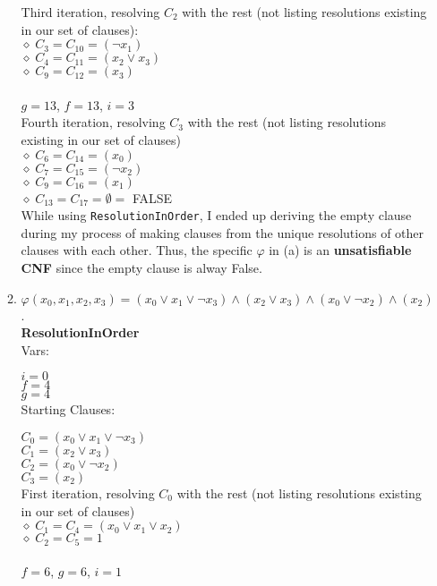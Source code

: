 \documentclass[11pt]{article}
\begin{document}
\begin{enumerate}
\begin{enumerate}
      Third iteration, resolving $C_2$ with the rest (not listing resolutions existing in our set of clauses): \\
      $\diamond \; C_3 = C_{10} = (\neg x_1)$ \\
      $\diamond \; C_4 = C_{11} = (x_2 \vee x_3) $ \\
      $\diamond \; C_9 = C_{12} = (x_3)$ \\
      \\
      $g = 13$, $f=13$, $i=3$ \\

      Fourth iteration, resolving $C_3$ with the rest (not listing resolutions existing in our set of clauses) \\
      $\diamond \; C_6 = C_{14} = (x_0)$ \\
      $\diamond \; C_7 = C_{15} = (\neg x_2)$ \\
      $\diamond \; C_9 = C_{16} = (x_1)$ \\
      $\diamond \; C_{13} = C_{17} = \emptyset =$ FALSE \\

      While using \texttt{ResolutionInOrder}, I ended up deriving the empty clause during my process of making clauses from the unique resolutions of other clauses with each other. Thus, the specific $\varphi$ in (a) is an \textbf{unsatisfiable CNF} since the empty clause is alway False.  \\
   

    \item $\varphi(x_0, x_1, x_2, x_3) = (x_0 \vee x_1 \vee \neg x_3) \wedge (x_2 \vee x_3) \wedge (x_0 \vee \neg x_2) \wedge (x_2)$. \\

    \textbf{ResolutionInOrder} \\

      Vars:
      
      $i = 0$ \\
      $f = 4$ \\
      $g = 4$ \\

      Starting Clauses:

      $C_0 = (x_0 \vee x_1 \vee \neg x_3) $ \\
      $C_1 = (x_2 \vee x_3)$ \\
      $C_2 = (x_0 \vee \neg x_2)$ \\
      $C_3 = (x_2)$ \\

      First iteration, resolving $C_0$ with the rest (not listing resolutions existing in our set of clauses) \\
      $\diamond \; C_1 = C_4 = (x_0 \vee x_1 \vee x_2)$ \\
      $\diamond \; C_2 = C_5 = 1$ \\
      \\
      $f=6$, $g = 6$, $i=1$ \\


\end{enumerate}
\end{enumerate}
\end{document}
